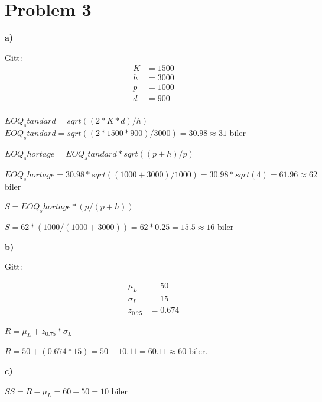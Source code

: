\documentclass{article}
\begin{document}
\pagebreak\section*{\textbf{Problem 3}}
\vspace*{12pt}\small\textbf{a)}

Gitt: 
\begin{align*}
  K &= 1500 \\        
  h &= 3000 \\        
  p &= 1000 \\        
  d &= 900 \\         
\end{align*}

$EOQ_standard = sqrt((2 * K * d) / h)$
$EOQ_standard = sqrt((2 * 1500 * 900) / 3000) = 30.98 \approx 31 $ biler

$EOQ_shortage = EOQ_standard * sqrt((p + h) / p)$

$EOQ_shortage = 30.98 * sqrt((1000 + 3000) / 1000) = 30.98 * sqrt(4) = 61.96 \approx 62 $ biler

$S = EOQ_shortage * (p / (p + h))$

$S = 62 * (1000 / (1000 + 3000)) = 62 * 0.25 = 15.5 \approx 16 $ biler


\vspace*{12pt}\small\textbf{b)}

Gitt:

\begin{align*}
  \mu_L &= 50 \\
  \sigma_L &= 15   \\    
  z_0.75 &= 0.674 
\end{align*}


$R = \mu_L + z_0.75 * \sigma_L$

$R = 50 + (0.674 * 15) = 50 + 10.11 = 60.11 \approx 60$ biler.

\vspace*{12pt}\small\textbf{c)}

$SS = R - \mu_L = 60 - 50 = 10$ biler
\end{document}
